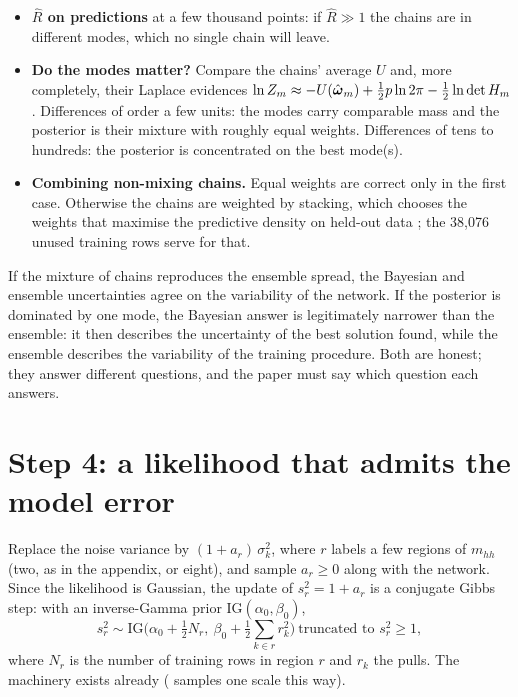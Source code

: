 \begin{itemize}
  \item \textbf{$\hat R$ on predictions} at a few thousand points: if $\hat R \gg 1$ the
    chains are in different modes, which no single chain will leave.
  \item \textbf{Do the modes matter?} Compare the chains' average $U$ and, more
    completely, their Laplace evidences
    $\ln Z_m \approx -U(\hat{\boldsymbol{\omega}}_m) + \tfrac12 p \ln 2\pi - \tfrac12 \ln\det H_m$.
    Differences of order a few units: the modes carry comparable mass and the posterior
    is their mixture with roughly equal weights. Differences of tens to hundreds: the
    posterior is concentrated on the best mode(s).
  \item \textbf{Combining non-mixing chains.} Equal weights are correct only in the first
    case. Otherwise the chains are weighted by stacking, which chooses the weights that
    maximise the predictive density on held-out data \cite{Yao:2022}; the 38,076 unused
    training rows serve for that.
\end{itemize}

\begin{watch}
If the mixture of chains reproduces the ensemble spread, the Bayesian and ensemble
uncertainties agree on the variability of the network. If the posterior is dominated by one
mode, the Bayesian answer is legitimately narrower than the ensemble: it then describes the
uncertainty of the best solution found, while the ensemble describes the variability of the
training procedure. Both are honest; they answer different questions, and the paper must
say which question each answers.
\end{watch}

\section{Step 4: a likelihood that admits the model error}
\label{sec:modelerror}

Replace the noise variance by $(1 + a_r)\,\sigma_k^2$, where $r$ labels a few regions of
$m_{hh}$ (two, as in the appendix, or eight), and sample $a_r \ge 0$ along with the
network. Since the likelihood is Gaussian, the update of $s_r^2 = 1 + a_r$ is a conjugate
Gibbs step: with an inverse-Gamma prior IG$(\alpha_0,\beta_0)$,
\begin{equation}
  s_r^2 \sim \mathrm{IG}\Big(\alpha_0 + \tfrac12 N_r,\ \beta_0 + \tfrac12
  \sum_{k \in r} r_k^2\Big)\ \text{truncated to } s_r^2 \ge 1 ,
\end{equation}
where $N_r$ is the number of training rows in region $r$ and $r_k$ the pulls. The
machinery exists already ( samples one scale this way).

